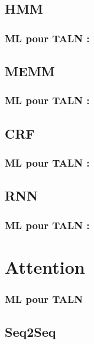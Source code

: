 \documentclass[xcolor=table]{beamer}
\begin{document}
\subsection{HMM}

\begin{frame}
	\frametitle{ML pour TALN : \insertsection}
	\framesubtitle{\insertsubsection}
	
\end{frame}

\subsection{MEMM}

\begin{frame}
	\frametitle{ML pour TALN : \insertsection}
	\framesubtitle{\insertsubsection}
	
\end{frame}

\subsection{CRF}

\begin{frame}
	\frametitle{ML pour TALN : \insertsection}
	\framesubtitle{\insertsubsection}
	
\end{frame}

\subsection{RNN}

\begin{frame}
	\frametitle{ML pour TALN : \insertsection}
	\framesubtitle{\insertsubsection}
	
\end{frame}
\section{Attention}

\begin{frame}
	\frametitle{ML pour TALN}
	\framesubtitle{\insertsection}
	
\end{frame}

\subsection{Seq2Seq}
\end{document}

